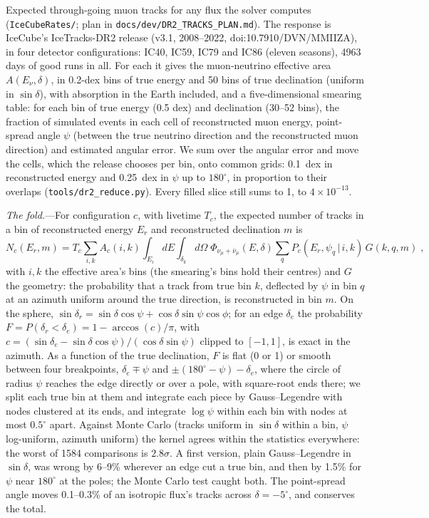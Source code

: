 \documentclass[11pt,a4paper]{article}
\newcommand{\file}[1]{\nolinkurl{#1}}
\begin{document}
Expected through-going muon tracks for any flux the solver computes (\file{IceCubeRates/}; plan in
\file{docs/dev/DR2\_TRACKS\_PLAN.md}). The response is IceCube's IceTracks-DR2 release (v3.1, 2008--2022,
doi:10.7910/DVN/MMIIZA), in four detector configurations: IC40, IC59, IC79 and IC86 (eleven seasons), 4963 days
of good runs in all. For each it gives the muon-neutrino effective area $A(E_\nu, \delta)$, in 0.2-dex bins of
true energy and 50 bins of true declination (uniform in $\sin\delta$), with absorption in the Earth included,
and a five-dimensional smearing table: for each bin of true energy (0.5 dex) and declination (30--52 bins), the
fraction of simulated events in each cell of reconstructed muon energy, point-spread angle $\psi$ (between the
true neutrino direction and the reconstructed muon direction) and estimated angular error. We sum over the
angular error and move the cells, which the release chooses per bin, onto common grids: 0.1~dex in reconstructed
energy and 0.25~dex in $\psi$ up to $180^\circ$, in proportion to their overlaps (\file{tools/dr2\_reduce.py}).
Every filled slice still sums to 1, to $4\times10^{-13}$.

\textit{The fold.}---For configuration $c$, with livetime $T_c$, the expected number of tracks in a bin of
reconstructed energy $E_r$ and reconstructed declination $m$ is
\begin{equation}
N_c(E_r, m) = T_c \sum_{i,k} A_c(i,k) \int_{E_i}\!dE \int_{\delta_k}\!d\Omega\; \Phi_{\nu_\mu+\bar\nu_\mu}(E,\delta)
\sum_q P_c(E_r, \psi_q \,|\, i, k)\, G(k, q, m) \;,
\end{equation}
with $i, k$ the effective area's bins (the smearing's bins hold their centres) and $G$ the geometry: the
probability that a track from true bin $k$, deflected by $\psi$ in bin $q$ at an azimuth uniform around the true
direction, is reconstructed in bin $m$. On the sphere, $\sin\delta_r = \sin\delta\cos\psi + \cos\delta\sin\psi\cos\phi$;
for an edge $\delta_e$ the probability $F = P(\delta_r < \delta_e) = 1 - \arccos(c)/\pi$, with
$c = (\sin\delta_e - \sin\delta\cos\psi)/(\cos\delta\sin\psi)$ clipped to $[-1, 1]$, is exact in the azimuth. As a
function of the true declination, $F$ is flat (0 or 1) or smooth between four breakpoints, $\delta_e \mp \psi$ and
$\pm(180^\circ - \psi) - \delta_e$, where the circle of radius $\psi$ reaches the edge directly or over a pole, with
square-root ends there; we split each true bin at them and integrate each piece by Gauss--Legendre with nodes
clustered at its ends, and integrate $\log\psi$ within each bin with nodes at most $0.5^\circ$ apart. Against Monte
Carlo (tracks uniform in $\sin\delta$ within a bin, $\psi$ log-uniform, azimuth uniform) the kernel agrees within
the statistics everywhere: the worst of 1584 comparisons is $2.8\sigma$. A first version, plain Gauss--Legendre in
$\sin\delta$, was wrong by 6--9\% wherever an edge cut a true bin, and then by 1.5\% for $\psi$ near $180^\circ$ at
the poles; the Monte Carlo test caught both. The point-spread angle moves 0.1--0.3\% of an isotropic flux's tracks
across $\delta = -5^\circ$, and conserves the total.
\end{document}
